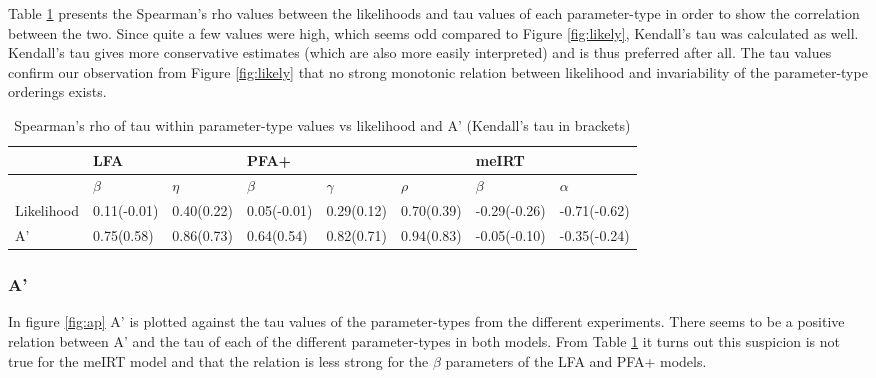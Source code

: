 \documentclass{scrartcl}
\begin{document}
Table \ref{tab:cor} presents the Spearman's rho values between the likelihoods and tau values of each parameter-type in order to show the correlation between the two. Since quite a few values were high, which seems odd compared to Figure \ref{fig:likely}, Kendall's tau was calculated as well.  Kendall's tau gives more conservative estimates (which are also more easily interpreted) and is thus preferred after all. The tau values confirm our observation from Figure \ref{fig:likely} that no strong monotonic relation between likelihood and invariability of the parameter-type orderings exists.

\begin{center}
\begin{table}[h]
\begin{tabular}{| l || l | l ||l|l |l||l|l|}

    \hline
     & LFA  & & PFA+ & & &meIRT &   \\ \hline
     & $\beta$ & $\eta$ & $\beta$ & $\gamma$ & $\rho$ & $\beta$ & $\alpha$  \\ \hline
    Likelihood     & 0.11(-0.01) & 0.40(0.22) & 0.05(-0.01) & 0.29(0.12) & 0.70(0.39) & -0.29(-0.26)&-0.71(-0.62) \\ \hline
    A'             & 0.75(0.58) & 0.86(0.73) & 0.64(0.54) & 0.82(0.71) & 0.94(0.83) & -0.05(-0.10)&-0.35(-0.24) \\ \hline

    \hline
\end{tabular}
\caption{Spearman's rho of tau within parameter-type values vs likelihood and A' (Kendall's tau in brackets)}
\label{tab:cor}
\end{table}
\end{center}


\subsubsection{A'}
In figure \ref{fig:ap} A' is plotted against the tau values of the parameter-types from the different experiments. There seems to be a positive relation between A' and the tau of each of the different parameter-types in both models. From Table \ref{tab:cor} it turns out this suspicion is not true for the meIRT model and that the relation is less strong for the $\beta$ parameters of the LFA and PFA+ models.
\end{document}

